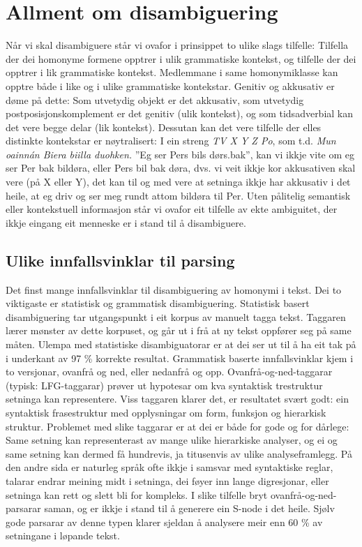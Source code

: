 \documentclass[a4paper,norsk]{article}
\begin{document}
\section{Allment om disambiguering}

Når vi skal disambiguere står vi ovafor i prinsippet to ulike slags tilfelle: Tilfella der dei homonyme formene opptrer i ulik grammatiske kontekst, og tilfelle der dei opptrer i lik grammatiske kontekst. Medlemmane i same homonymiklasse kan opptre både i like og i ulike grammatiske kontekstar. Genitiv og akkusativ er døme på dette: Som utvetydig objekt er det akkusativ, som utvetydig postposisjonskomplement er det genitiv (ulik kontekst), og som tidsadverbial kan det vere begge delar (lik kontekst). Dessutan kan det vere tilfelle der elles distinkte kontekstar er nøytralisert: I ein streng \textit{TV X Y Z Po}, som t.d. \textit{Mun oainnán Biera biilla duohken.} ''Eg ser Pers bils dørs.bak'', kan vi ikkje vite om eg ser Per bak bildøra, eller Pers bil bak døra, dvs. vi veit ikkje kor akkusativen skal vere (på X eller Y), det kan til og med vere at setninga ikkje har akkusativ i det heile, at eg driv og ser meg rundt attom bildøra til Per. Uten pålitelig semantisk eller kontekstuell informasjon står vi ovafor eit tilfelle av ekte ambiguitet, der ikkje eingang eit menneske er i stand til å disambiguere.%


\subsection{Ulike innfallsvinklar til parsing}

Det finst mange innfallsvinklar til disambiguering av homonymi i tekst. Dei to viktigaste er statistisk og grammatisk disambiguering. Statistisk basert disambiguering tar utgangspunkt i eit korpus av manuelt tagga tekst. Taggaren lærer mønster av dette korpuset, og går ut i frå at ny tekst oppfører seg på same måten. Ulempa med statistiske disambiguatorar er at dei ser ut til å ha eit tak på i underkant av 97 \% korrekte resultat.  Grammatisk baserte innfallsvinklar kjem i to versjonar, ovanfrå og ned, eller nedanfrå og opp. Ovanfrå-og-ned-taggarar (typisk: LFG-taggarar) prøver ut hypotesar om kva syntaktisk trestruktur setninga kan representere. Viss taggaren klarer det, er resultatet svært godt: ein syntaktisk frasestruktur med opplysningar om form, funksjon og hierarkisk struktur. Problemet med slike taggarar er at dei er både for gode og for dårlege: Same setning kan representerast av mange ulike hierarkiske analyser, og ei og same setning kan dermed få hundrevis, ja titusenvis av ulike analyseframlegg. På den andre sida er naturleg språk ofte ikkje i samsvar med syntaktiske reglar, talarar endrar meining midt i setninga, dei føyer inn lange digresjonar, eller setninga kan rett og slett bli for kompleks. I slike tilfelle bryt ovanfrå-og-ned-parsarar saman, og er ikkje i stand til å generere ein S-node i det heile. Sjølv gode parsarar av denne typen klarer sjeldan å analysere meir enn 60 \% av setningane i løpande tekst.%
\end{document}

